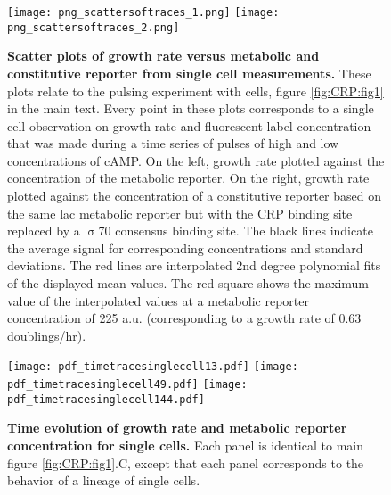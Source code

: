 \begin{figure}%
	\centering
	\texttt{[image: png\_scattersoftraces\_1.png]}
	\texttt{[image: png\_scattersoftraces\_2.png]}	
	\caption{ 
		\textbf{Scatter plots of growth rate versus metabolic and constitutive reporter from single cell measurements.}
        These plots relate to the pulsing experiment with \dcamp cells, figure \ref{fig:CRP:fig1} in the main text.
		Every point in these plots corresponds to a single cell observation on growth rate and fluorescent label concentration
        that was made during a time series of pulses of high and low concentrations of cAMP.
		On the left, growth rate plotted against the concentration of the metabolic reporter.
		On the right, growth rate plotted against the concentration of a constitutive reporter based on the same lac metabolic reporter but with the CRP binding site replaced by a $\upsigma$70 consensus binding site.
		The black lines indicate the average signal for corresponding concentrations and standard deviations.
		The red lines are interpolated 2nd degree polynomial fits of the displayed mean values.
		The red square shows the maximum value of the interpolated values at a metabolic reporter concentration of 225 a.u. (corresponding to a growth rate of 0.63 doublings/hr).
	}
	\label{fig:CRP:scatterspulsing}
\end{figure}%


\begin{figure}%
	\centering
	\texttt{[image: pdf\_timetracesinglecell13.pdf]}
	\texttt{[image: pdf\_timetracesinglecell49.pdf]}
	\texttt{[image: pdf\_timetracesinglecell144.pdf]}
	\label{fig:CRP:timevolutionCRPgrowthsinglecell}
    \caption{    
	\textbf{Time evolution of growth rate and metabolic reporter concentration for single cells.}
	Each panel is identical to main figure \ref{fig:CRP:fig1}.C, except that each panel corresponds to the behavior of a lineage of single cells.
}
\end{figure}%



